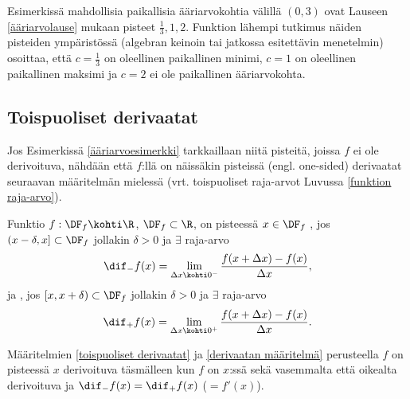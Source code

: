 Esimerkissä mahdollisia paikallisia ääriarvokohtia välillä $(0,3)$ ovat Lauseen 
\ref{ääriarvolause} mukaan pisteet $\tfrac{1}{3},1,2$. Funktion lähempi tutkimus näiden
pisteiden ympäristössä (algebran keinoin tai jatkossa esitettävin menetelmin) osoittaa, että
$c=\tfrac{1}{3}$ on oleellinen paikallinen minimi, $c=1$ on oleellinen paikallinen maksimi ja
$c=2$ ei ole paikallinen ääriarvokohta.

\subsection*{Toispuoliset derivaatat}

Jos Esimerkissä \ref{ääriarvoesimerkki} tarkkaillaan niitä pisteitä, joissa $f$ ei ole 
derivoituva, nähdään että $f$:llä on näissäkin pisteissä  (engl. one-sided) 
derivaatat seuraavan määritelmän mielessä (vrt. toispuoliset raja-arvot Luvussa 
\ref{funktion raja-arvo}).
\begin{Def} \label{toispuoliset derivaatat} 
 
Funktio $f:\DF_f\kohti\R$, $\DF_f\subset\R$, on pisteessä $x\in\DF_f$
, jos $(x-\delta,x]\subset\DF_f$ jollakin $\delta>0$ ja $\exists$
raja-arvo
\[
\dif_-f(x)=\lim_{\Delta x\kohti 0^-} \frac{f(x+\Delta x)-f(x)}{\Delta x},
\]
ja , jos $[x,x+\delta)\subset\DF_f$ jollakin $\delta>0$ ja $\exists$ 
raja-arvo
\[
\dif_+f(x)=\lim_{\Delta x\kohti 0^+} \frac{f(x+\Delta x)-f(x)}{\Delta x}.
\]
\end{Def}
Määritelmien \ref{toispuoliset derivaatat} ja \ref{derivaatan määritelmä} perusteella $f$ on
pisteessä $x$ derivoituva täsmälleen kun $f$ on $x$:ssä sekä vasemmalta että oikealta
derivoituva ja $\dif_-f(x)=\dif_+f(x)$ ($=f'(x)$).

